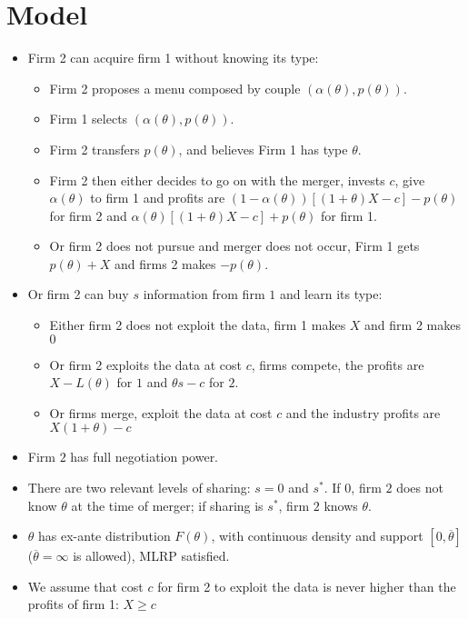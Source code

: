 \documentclass[a4paper]{article}
\renewcommand{\t}{\theta}
\renewcommand{\a}{\alpha}
\begin{document}
\section{Model}
\begin{itemize}
    \item Firm 2 can acquire firm 1 without knowing its type:
    \begin{itemize}
        \item Firm 2 proposes a menu composed by couple $(\a(\t),p(\t))$. 
        \item Firm 1 selects $(\a(\t),p(\t))$.
        \item Firm 2 transfers $p(\t)$, and believes Firm 1 has type $\t$.
        \item Firm 2 then either decides to go on with the merger, invests $c$, give $\a(\t)$ to firm 1 and profits are $(1-\a(\t))[(1+\t)X-c]-p(\t)$ for firm 2 and $\a(\t)[(1+\t)X-c]+p(\t)$ for firm 1.
        \item Or firm 2 does not pursue and merger does not occur, Firm 1 gets $p(\t)+X$ and firms 2 makes $-p(\t)$.
    \end{itemize}   
  \item Or firm 2 can buy $s$ information from firm $1$ and learn its type:
  \begin{itemize}
      \item Either firm 2 does not exploit the data, firm 1 makes $X$ and firm 2 makes $0$
      \item Or firm 2 exploits the data at cost $c$, firms compete, the profits are $X-L(\t)$ for $1$ and $\t s-c$ for $2$.
      \item Or firms merge, exploit the data at cost $c$ and the industry profits are $X(1+\t)-c$
  \end{itemize}
  \item Firm $2$ has full negotiation power.
  \item There are two relevant levels of sharing: $s=0$ and $s^*$. If $0$, firm $2$ does not know $\t$ at the time of merger; if sharing is $s^*$, firm $2$ knows $\t$.
  \item $\t$ has ex-ante distribution $F(\t)$, with continuous density and support $[0,\overline \t]$ ($\overline \t=\infty$ is allowed), MLRP satisfied.
  \item We assume that cost $c$ for firm 2 to exploit the data is never higher than the profits of firm 1: $X\geq c$
\end{itemize}
\end{document}
